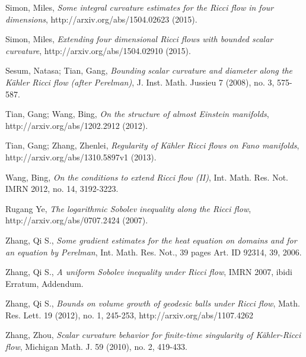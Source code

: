 \documentclass[11pt]{amsart}
\numberwithin{equation}{section}
\numberwithin{equation}{section}
\begin{document}
\begin{thebibliography}{00000}
 Simon, Miles, {\it Some integral curvature estimates for the Ricci flow in four dimensions}, http://arxiv.org/abs/1504.02623 (2015).

 Simon, Miles, {\it Extending four dimensional Ricci flows with bounded scalar curvature}, http://arxiv.org/abs/1504.02910 (2015).

 Sesum, Natasa; Tian, Gang, {\it Bounding scalar curvature and diameter along the K\"ahler Ricci flow (after Perelman)}, J. Inst. Math. Jussieu 7 (2008), no. 3, 575-587.

 Tian, Gang; Wang, Bing,
{\it On the structure of almost Einstein manifolds}, http://arxiv.org/abs/1202.2912 (2012).

 Tian, Gang; Zhang, Zhenlei, 
{\it Regularity of  K\"ahler Ricci flows on Fano manifolds}, http://arxiv.org/abs/1310.5897v1 (2013).

 Wang, Bing, {\it On the conditions to extend Ricci flow (II)},
 Int. Math. Res. Not. IMRN 2012, no. 14, 3192-3223.

 Rugang Ye, {\it The logarithmic Sobolev inequality along the Ricci flow}, http://arxiv.org/abs/0707.2424 (2007).

 Zhang, Qi S., {\it Some gradient estimates for the heat equation on domains and for an equation by Perelman}, Int. Math. Res. Not., 39 pages Art. ID 92314, 39, 2006.

 Zhang, Qi S., {\it A uniform Sobolev inequality under Ricci flow},
IMRN 2007, ibidi Erratum, Addendum.

 Zhang, Qi S., {\it Bounds on volume growth of geodesic balls under Ricci flow}, Math. Res. Lett. 19 (2012), no. 1, 245-253, http://arxiv.org/abs/1107.4262

 Zhang, Zhou, {\it Scalar curvature behavior for finite-time singularity of K\"ahler-Ricci flow}, Michigan Math. J. 59 (2010), no. 2, 419-433.
\end{thebibliography}
\end{document}
